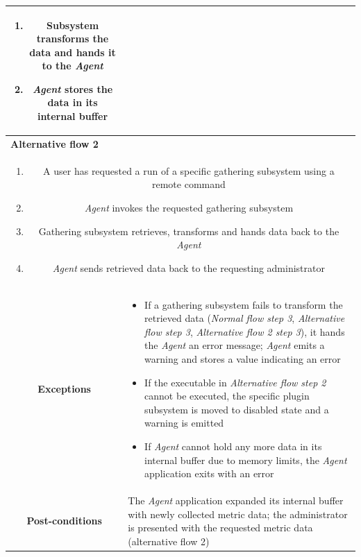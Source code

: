 \documentclass[12pt,a4paper,table]{article}
\begin{document}
\begin{longtable}{ |c|p{11.8cm}| }
{\begin{enumerate}
                        \item Subsystem transforms the data and hands it to the \textit{Agent}
                        \item \textit{Agent} stores the data in its internal buffer
                    \end{enumerate}
                }\\ \hline
                \multicolumn{2}{|l|}{\cellcolor[gray]{0.9} \textbf{Alternative flow 2}}\\ \hline
                \multicolumn{2}{|p{14cm}|}{
                    \begin{enumerate}
                        \item A user has requested a run of a specific gathering subsystem using a remote command
                        \item \textit{Agent} invokes the requested gathering subsystem
                        \item Gathering subsystem retrieves, transforms and hands data back to the \textit{Agent}
                        \item \textit{Agent} sends retrieved data back to the requesting administrator
                    \end{enumerate}
                }\\ \hline
                \cellcolor[gray]{0.9} \textbf{Exceptions} & 
                    \begin{itemize}
                        \item If a gathering subsystem fails to transform the retrieved data (\textit{Normal flow step 3}, \textit{Alternative flow step 3}, \textit{Alternative flow 2 step 3}), it hands the \textit{Agent} an error message; \textit{Agent} emits a warning and stores a value indicating an error
                        \item If the executable in \textit{Alternative flow step 2} cannot be executed, the specific plugin subsystem is moved to disabled state and a warning is emitted
                        \item If \textit{Agent} cannot hold any more data in its internal buffer due to memory limits, the \textit{Agent} application exits with an error
                    \end{itemize}\\ \hline
                \cellcolor[gray]{0.9} \textbf{Post-conditions} & The \textit{Agent} application expanded its internal buffer with newly collected metric data; the administrator is presented with the requested metric data (alternative flow 2)\\ \hline
            \end{longtable}
\end{document}
